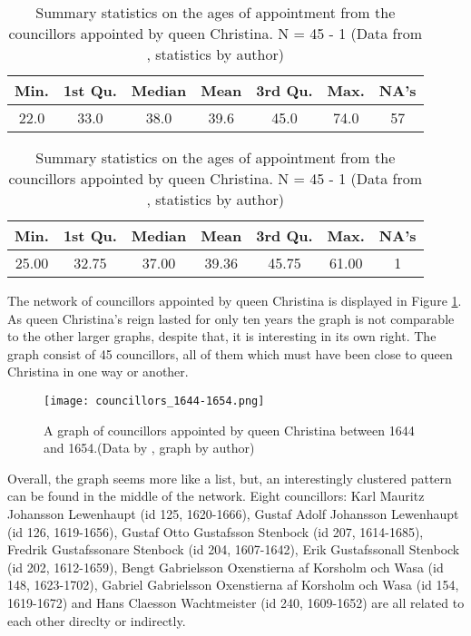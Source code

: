 \begin{table}
	\caption[Summary statistics on the councillors ages of appointment]{Summary statistics on the councillors ages of appointment from the whole dataset (including the reign of Christina). NA meaning a missing value. N = 257 - 57 (Data from \cite{councillorsDS}, statistics by author)}
	\label{councillorsages}
	\centering
	\begin{tabular}{c c c c c c c}
		\hline
		Min. & 1st Qu. & Median & Mean & 3rd Qu. & Max. & NA's \\
		\hline
		22.0 & 33.0 & 38.0 & 39.6 & 45.0 & 74.0 & 57 \\
		\hline
	\end{tabular}
	
	\caption[Summary statistics on the councillors ages appointed by queen Christina]{Summary statistics on the ages of appointment from the councillors appointed by queen Christina. N = 45 - 1 (Data from \cite{councillorsDS}, statistics by author)}
	\label{agesByChristina}
	\centering
	\begin{tabular}{c c c c c c c}
		\hline
		Min. & 1st Qu. & Median & Mean & 3rd Qu. & Max. & NA's \\
		\hline
		25.00 & 32.75 & 37.00 & 39.36 & 45.75 & 61.00 & 1\\
		\hline
	\end{tabular}
\end{table}

The network of councillors appointed by queen Christina is displayed in Figure \ref{queenChristinaCouncillors}. As queen Christina's reign lasted for only ten years the graph is not comparable to the other larger graphs, despite that, it is interesting in its own right. The graph consist of 45 councillors, all of them which must have been close to queen Christina in one way or another.

\begin{figure}	
	\texttt{[image: councillors\_1644-1654.png]}
	\caption[Councillors appointed by queen Christina]{A graph of councillors appointed by queen Christina between 1644 and 1654.(Data by \cite{councillorsDS}, graph by author)}
	\label{queenChristinaCouncillors}
	\centering
\end{figure}

Overall, the graph seems more like a list, but, an interestingly clustered pattern can be found in the middle of the network. Eight councillors: Karl Mauritz Johansson Lewenhaupt (id 125, 1620-1666), Gustaf Adolf Johansson Lewenhaupt (id 126, 1619-1656), Gustaf Otto Gustafsson Stenbock (id 207, 1614-1685), Fredrik Gustafssonare Stenbock (id 204, 1607-1642), Erik Gustafssonall Stenbock (id 202, 1612-1659), Bengt Gabrielsson Oxenstierna af Korsholm och Wasa (id 148, 1623-1702), Gabriel Gabrielsson Oxenstierna af Korsholm och Wasa (id 154, 1619-1672) and Hans Claesson Wachtmeister (id 240, 1609-1652) are all related to each other direclty or indirectly. 

